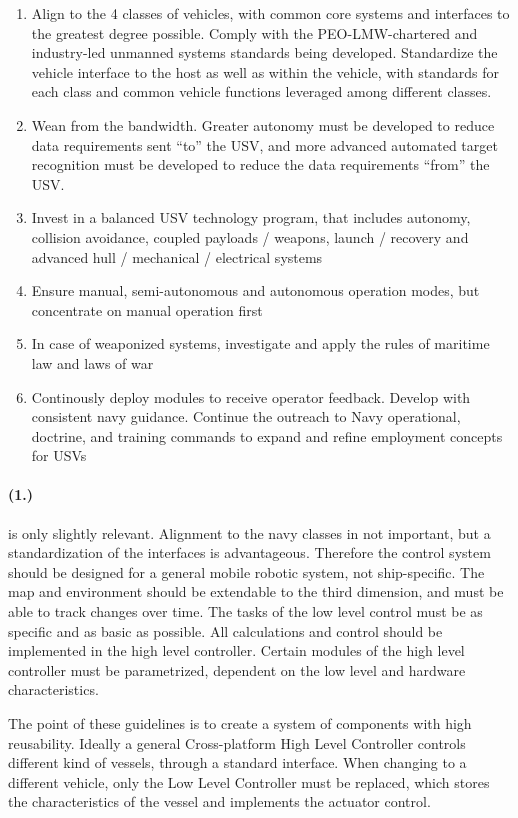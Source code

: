 \begin{enumerate}
	\item Align to the 4 classes of vehicles, with common core systems and interfaces to the greatest degree possible. Comply with the PEO-LMW-chartered and industry-led unmanned systems standards being developed. Standardize the vehicle interface to the host as well as within the vehicle, with standards for each class and common vehicle functions leveraged among different classes.
	\item Wean from the bandwidth. Greater autonomy must be developed to reduce data requirements sent “to” the USV, and more advanced automated target recognition must be developed to reduce the data requirements “from” the USV.
	\item Invest in a balanced USV technology program, that includes autonomy, collision avoidance, coupled payloads / weapons, launch / recovery and advanced hull / mechanical / electrical systems
	\item Ensure manual, semi-autonomous and autonomous operation modes, but concentrate on manual operation first
	\item In case of weaponized systems, investigate and apply the rules of maritime law and laws of war
	\item Continously deploy modules to receive operator feedback. Develop with consistent navy guidance. Continue the outreach to Navy operational, doctrine, and training commands to expand and refine employment concepts for USVs
\end{enumerate}

\paragraph{(1.)} is only slightly relevant. Alignment to the navy classes in not important, but a standardization of the interfaces is advantageous.
Therefore the control system should be designed for a general mobile robotic system, not ship-specific. The map and environment should be extendable to the third dimension, and must be able to track changes over time. The tasks of the low level control must be as specific and as basic as possible. All calculations and control should be implemented in the high level controller. Certain modules of the high level controller must be parametrized, dependent on the low level and hardware characteristics.

The point of these guidelines is to create a system of components with high reusability. Ideally a general Cross-platform High Level Controller controls different kind of vessels, through a standard interface. When changing to a different vehicle, only the Low Level Controller must be replaced, which stores the characteristics of the vessel and implements the actuator control.

